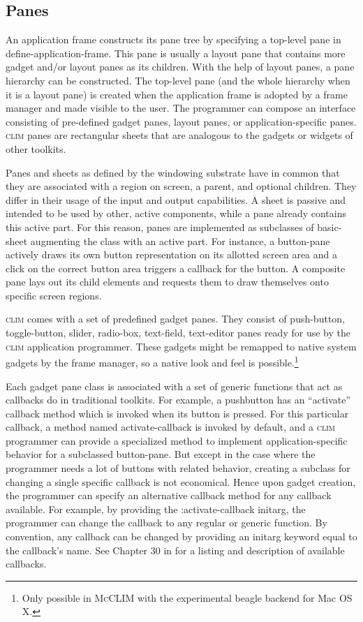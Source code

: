 \documentclass[twocolumn,a4paper]{article}
\newcommand {\code}[1]{{\sffamily #1}}
\newcommand {\CLIM}{\textsc{clim}}
\newcommand {\mcclim}{\textsc{McCLIM}}
\let\class\code
\let\method\code
\let\macro\code
\let\keyword\code
\begin{document}
\subsection{Panes}

An application frame constructs its pane tree by specifying a
top-level pane in \macro{define-application-frame}. This pane is
usually a layout pane that contains more gadget and/or layout panes as
its children. With the help of layout panes, a pane hierarchy can be
constructed. The top-level pane (and the whole hierarchy when it is a
layout pane) is created when the application frame is adopted by a
frame manager and made visible to the user. The programmer can compose
an interface consisting of pre-defined gadget panes, layout panes, or
application-specific panes. \CLIM{} panes are rectangular sheets that
are analogous to the gadgets or widgets of other toolkits.

Panes and sheets as defined by the windowing substrate have in common
that they are associated with a region on screen, a parent, and
optional children. They differ in their usage of the input and output
capabilities. A sheet is passive and intended to be used by other,
active components, 
while a pane already contains this active part. 
For this reason,
panes are implemented as subclasses of \class{basic-sheet}
augmenting the class with an active part. For instance, a button-pane
actively draws its own button representation on its allotted screen
area and a click on the correct button area triggers a callback for
the button. A composite pane lays out its child elements and
requests them to draw themselves onto specific screen regions.

\CLIM{} comes with a set of predefined gadget panes. They consist of
push-button, toggle-button, slider, radio-box, text-field, text-editor
panes ready for use by the \CLIM{} application programmer. These
gadgets might be remapped to native system gadgets by the frame
manager, so a native look and feel is possible.\footnote{Only possible
  in \mcclim{} with the experimental beagle backend for Mac OS X.}

Each gadget pane class is associated with a set of generic functions
that act as callbacks do in traditional toolkits. For example, a pushbutton
has an ``activate'' callback method which is invoked when its button
is pressed. For this particular callback, a method named
\method{activate-callback} is invoked by default, and a \CLIM{}
programmer can provide a specialized method to implement
application-specific behavior for a subclassed button-pane. But except
in the case where the programmer needs a lot of buttons with related
behavior, creating a subclass for changing a single specific callback
is not economical. Hence upon gadget creation, the programmer can
specify an alternative callback method for any callback available. For
example, by
providing the \keyword{:activate-callback} initarg, the programmer can
change the callback to any regular or generic function. By convention,
any callback can be changed by providing an initarg keyword equal to
the callback's name. See Chapter 30 in \cite{clim-spec} for a listing
and description of available callbacks.
\end{document}
